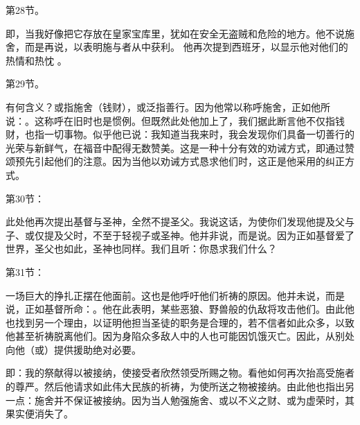 第28节。 \par

即，当我好像把它存放在皇家宝库里，犹如在安全无盗贼和危险的地方。他不说施舍，而是再说，以表明施与者从中获利。 他再次提到西班牙，以显示他对他们的热情和热忱 。\par

第29节。 \par

有何含义？或指施舍（钱财），或泛指善行。因为他常以称呼施舍，正如他所说：。这称呼在旧时也是惯例。但既然此处他加上了，我们据此断言他不仅指钱财，也指一切事物。似乎他已说：我知道当我来时，我会发现你们具备一切善行的光荣与新鲜气，在福音中配得无数赞美。这是一种十分有效的劝诫方式，即通过赞颂预先引起他们的注意。因为当他以劝诫方式恳求他们时，这正是他采用的纠正方式。\par

第30节：\par

此处他再次提出基督与圣神，全然不提圣父。我说这话，为使你们发现他提及父与子、或仅提及父时，不至于轻视子或圣神。他并非说，而是说。因为正如基督爱了世界，圣父也如此，圣神也同样。我们且听：你恳求我们什么？\par

第31节：\par

一场巨大的挣扎正摆在他面前。这也是他呼吁他们祈祷的原因。他并未说，而是说，正如基督所命：。他在此表明，某些恶狼、野兽般的仇敌将攻击他们。由此他也找到另一个理由，以证明他担当圣徒的职务是合理的，若不信者如此众多，以致他甚至祈祷脱离他们。因为身陷众多敌人中的人也可能因饥饿灭亡。因此，从别处向他（或）提供援助绝对必要。\par

即：我的祭献得以被接纳，使接受者欣然领受所赐之物。看他如何再次抬高受施者的尊严。然后他请求如此伟大民族的祈祷，为使所送之物被接纳。由此他也指出另一点：施舍并不保证被接纳。因为当人勉强施舍、或以不义之财、或为虚荣时，其果实便消失了。\par

